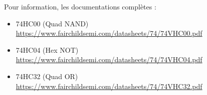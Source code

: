 \documentclass[11pt,a4paper]{article}
\theoremstyle{definition}%
\begin{document}
Pour information, les documentations complètes :
\begin{itemize}
\item 74HC00 (Quad NAND) \href{https://www.fairchildsemi.com/datasheets/74/74VHC00.pdf}{https://www.fairchildsemi.com/datasheets/74/74VHC00.pdf}
\item 74HC04 (Hex NOT) \href{https://www.fairchildsemi.com/datasheets/74/74VHC04.pdf}{https://www.fairchildsemi.com/datasheets/74/74VHC04.pdf}
\item 74HC32 (Quad OR) \href{https://www.fairchildsemi.com/datasheets/74/74VHC32.pdf}{https://www.fairchildsemi.com/datasheets/74/74VHC32.pdf}
\end{itemize}
\end{document}
